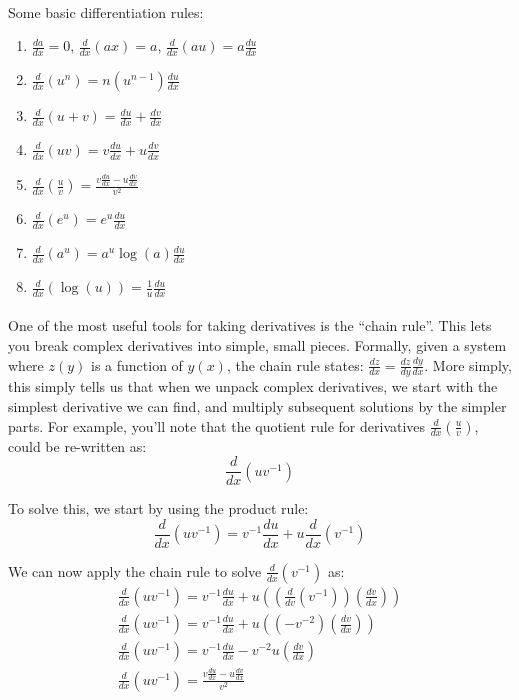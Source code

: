 \documentclass[12pt]{article}
\begin{document}
\paragraph{} Some basic differentiation rules:
\begin{enumerate}
\item{} $\frac{da}{dx}=0$, $\frac{d}{dx}(ax)=a$, $\frac{d}{dx}(au) = a \frac{du}{dx}$
\item{} $\frac{d}{dx}(u^{n})=n(u^{n-1})\frac{du}{dx}$
\item{} $\frac{d}{dx}(u+v) = \frac{du}{dx} + \frac{dv}{dx}$
\item{} $\frac{d}{dx}(uv) = v\frac{du}{dx} + u\frac{dv}{dx}$
\item{} $\frac{d}{dx}(\frac{u}{v}) = \frac{v\frac{du}{dx}-u\frac{dv}{dx}}{v^2}$
\item{} $\frac{d}{dx}(e^{u}) = e^{u}\frac{du}{dx}$
\item{} $\frac{d}{dx}(a^{u}) = a^{u}\log(a)\frac{du}{dx}$
\item{} $\frac{d}{dx}(\log(u)) = \frac{1}{u}\frac{du}{dx}$
\end{enumerate}

\paragraph{} One of the most useful tools for taking derivatives is the ``chain rule''. This lets you break complex derivatives into simple, small pieces. Formally, given a system where $z(y)$ is a function of $y(x)$, the chain rule states: $\frac{dz}{dx} = \frac{dz}{dy}\frac{dy}{dx}$. More simply, this simply tells us that when we unpack complex derivatives, we start with the simplest derivative we can find, and multiply subsequent solutions by the simpler parts. For example, you'll note that the quotient rule for derivatives $\frac{d}{dx}(\frac{u}{v})$, could be re-written as:
\begin{equation}
\frac{d}{dx}(uv^{-1})
\end{equation}

To solve this, we start by using the product rule:
\begin{equation}
\frac{d}{dx}(uv^{-1}) = v^{-1}\frac{du}{dx} + u\frac{d}{dx}(v^{-1})
\end{equation}

We can now apply the chain rule to solve $\frac{d}{dx}(v^{-1})$ as:
\begin{equation}
\begin{split}
\frac{d}{dx}(uv^{-1}) = v^{-1}\frac{du}{dx} + u\left((\frac{d}{dv}(v^{-1}))(\frac{dv}{dx})\right)\\
\frac{d}{dx}(uv^{-1}) = v^{-1}\frac{du}{dx} + u\left((-v^{-2})(\frac{dv}{dx})\right)\\
\frac{d}{dx}(uv^{-1}) = v^{-1}\frac{du}{dx} -v^{-2}u\left(\frac{dv}{dx}\right)\\
\frac{d}{dx}(uv^{-1}) = \frac{v\frac{du}{dx}-u\frac{dv}{dx}}{v^2}
\end{split}
\end{equation}
\end{document}
